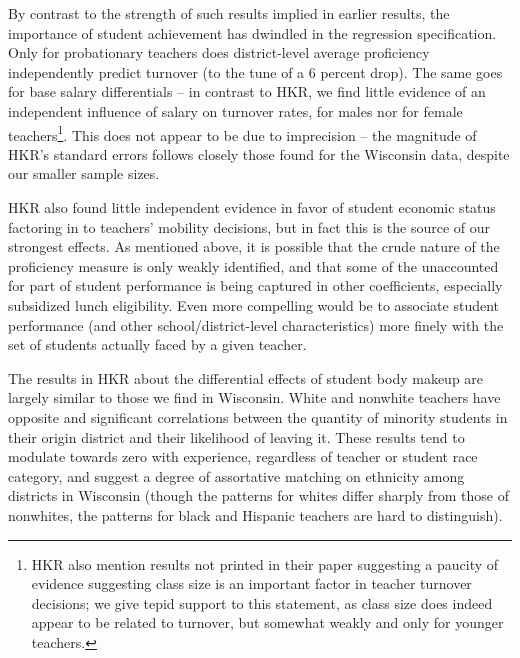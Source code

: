 \documentclass[12pt,]{article}
\let\rmarkdownfootnote\footnote%
\def\footnote{\protect\rmarkdownfootnote}
\begin{document}
By contrast to the strength of such results implied in earlier results,
the importance of student achievement has dwindled in the regression
specification. Only for probationary teachers does district-level
average proficiency independently predict turnover (to the tune of a 6
percent drop). The same goes for base salary differentials -- in
contrast to HKR, we find little evidence of an independent influence of
salary on turnover rates, for males nor for female teachers\footnote{HKR
  also mention results not printed in their paper suggesting a paucity
  of evidence suggesting class size is an important factor in teacher
  turnover decisions; we give tepid support to this statement, as class
  size does indeed appear to be related to turnover, but somewhat weakly
  and only for younger teachers.}. This does not appear to be due to
imprecision -- the magnitude of HKR's standard errors follows closely
those found for the Wisconsin data, despite our smaller sample sizes.

HKR also found little independent evidence in favor of student economic
status factoring in to teachers' mobility decisions, but in fact this is
the source of our strongest effects. As mentioned above, it is possible
that the crude nature of the proficiency measure is only weakly
identified, and that some of the unaccounted for part of student
performance is being captured in other coefficients, especially
subsidized lunch eligibility. Even more compelling would be to associate
student performance (and other school/district-level characteristics)
more finely with the set of students actually faced by a given teacher.

The results in HKR about the differential effects of student body makeup
are largely similar to those we find in Wisconsin. White and nonwhite
teachers have opposite and significant correlations between the quantity
of minority students in their origin district and their likelihood of
leaving it. These results tend to modulate towards zero with experience,
regardless of teacher or student race category, and suggest a degree of
assortative matching on ethnicity among districts in Wisconsin (though
the patterns for whites differ sharply from those of nonwhites, the
patterns for black and Hispanic teachers are hard to distinguish).
\end{document}
